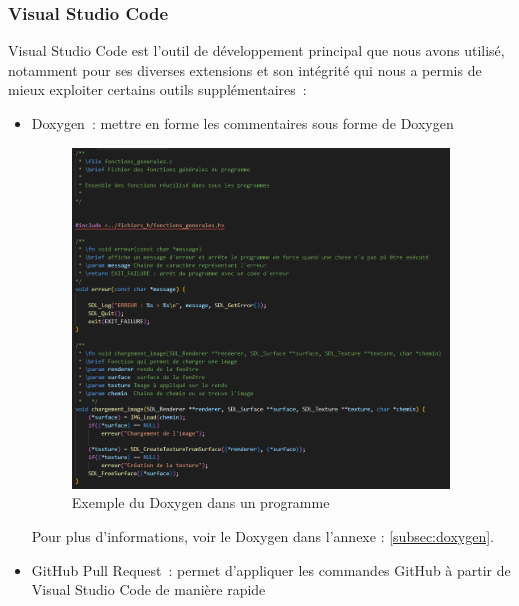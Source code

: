 \documentclass[12pt,a4paper]{article}
\begin{document}
             \subsubsection{Visual Studio Code}
                \tabto{1cm} Visual Studio Code est l’outil de développement principal que nous avons utilisé, notamment pour ses diverses extensions et son intégrité qui nous a permis de mieux exploiter certains outils supplémentaires~:\\

                \newpage
                
                \begin{itemize}
                    \item Doxygen~: mettre en forme les commentaires sous forme de Doxygen\\

                    \begin{figure}[h]
                        \centering
                        \includegraphics[width=10cm]{images/doxygen.png}
                        \caption{Exemple du Doxygen dans un programme}
                    \end{figure}

                    Pour plus d'informations, voir le Doxygen dans l'annexe : \ref{subsec:doxygen}.\\
                    
                    \item GitHub Pull Request~: permet d’appliquer les commandes GitHub à partir de Visual Studio Code de manière rapide
                \end{itemize}
                
\end{document}
